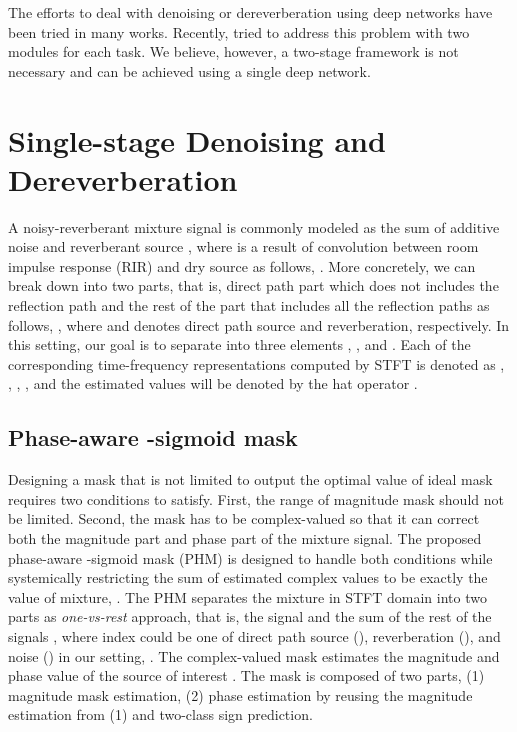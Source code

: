 \documentclass[a4paper]{article}
\begin{document}
The efforts to deal with denoising or dereverberation using deep networks have been tried in many works. Recently, \cite{zhao2018two, maciejewski2019whamr} tried to address this problem with two modules for each task. 
We believe, however, a two-stage framework is not necessary and can be achieved using a single deep network.

\section{Single-stage Denoising and Dereverberation}
A noisy-reverberant mixture signal  is commonly modeled as the sum of additive noise  and reverberant source , where  is a result of convolution between room impulse response (RIR)  and dry source  as follows,
.
More concretely, we can break down  into two parts, that is, direct path part  which does not includes the reflection path and the rest of the part  that includes all the reflection paths as follows, 
,
where  and  denotes direct path source and reverberation, respectively.
In this setting, our goal is to separate  into three elements , , and .
Each of the corresponding time-frequency  representations computed by STFT is denoted as , , , , and the estimated values will be denoted by the hat operator . 

\subsection{Phase-aware \texorpdfstring{}{}-sigmoid mask}
Designing a mask that is not limited to output the optimal value of ideal mask requires two conditions to satisfy.
First, the range of magnitude mask should not be limited.
Second, the mask has to be complex-valued so that it can correct both the magnitude part and phase part of the mixture signal.
The proposed phase-aware -sigmoid mask (PHM) is designed to handle both conditions while systemically restricting the sum of estimated complex values to be exactly the value of mixture, .
The PHM separates the mixture  in STFT domain into two parts as \textit{one-vs-rest} approach, that is, the signal  and the sum of the rest of the signals , where index  could be one of direct path source (), reverberation (), and noise () in our setting, .
The complex-valued mask  estimates the magnitude and phase value of the source of interest .
The mask is composed of two parts, (1) magnitude mask estimation, (2) phase estimation by reusing the magnitude estimation from (1) and two-class sign prediction.
\end{document}
